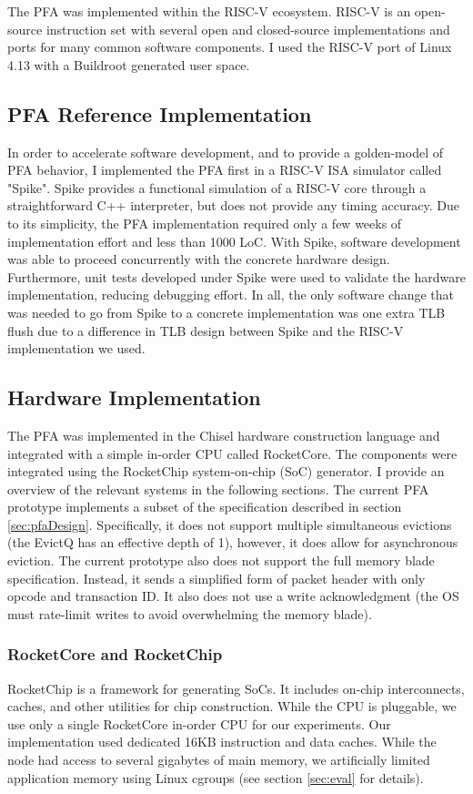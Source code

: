 The PFA was implemented within the RISC-V ecosystem. RISC-V is an open-source
instruction set with several open and closed-source implementations and ports
for many common software components\cite{riscv}. I used the RISC-V port of
Linux 4.13 with a Buildroot generated user
space.

\subsection{PFA Reference Implementation}
In order to accelerate software development, and to provide a golden-model of
PFA behavior, I implemented the PFA first in a RISC-V ISA simulator called
"Spike"\cite{spike}. Spike provides a functional simulation of a RISC-V core
through a straightforward C++ interpreter, but does not provide any timing
accuracy. Due to its simplicity, the PFA implementation required only a few
weeks of implementation effort and less than 1000 LoC. With Spike, software
development was able to proceed concurrently with the concrete hardware design.
Furthermore, unit tests developed under Spike were used to validate the
hardware implementation, reducing debugging effort. In all, the only software
change that was needed to go from Spike to a concrete implementation was one
extra TLB flush due to a difference in TLB design between Spike and the RISC-V
implementation we used.

\subsection{Hardware Implementation}
The PFA was implemented in the Chisel hardware construction
language\cite{chisel} and integrated with a simple in-order CPU called
RocketCore\cite{rocketCore}. The components were integrated using the
RocketChip system-on-chip (SoC) generator\cite{rocketChip}. I provide an
overview of the relevant systems in the following sections. The current PFA
prototype implements a subset of the specification described in
section \ref{sec:pfaDesign}. Specifically, it does not support multiple
simultaneous evictions (the EvictQ has an effective depth of 1), however, it
does allow for asynchronous eviction. The current prototype also does not
support the full memory blade specification. Instead, it sends a simplified form
of packet header with only opcode and transaction ID. It also does not use a
write acknowledgment (the OS must rate-limit writes to avoid overwhelming the
memory blade).
 
\subsubsection{RocketCore and RocketChip}
RocketChip\cite{rocketChip} is a framework for generating SoCs. It includes
on-chip interconnects, caches, and other utilities for chip construction. While
the CPU is pluggable, we use only a single RocketCore in-order CPU for our
experiments. Our implementation used dedicated 16KB instruction and data
caches. While the node had access to several gigabytes of main memory, we
artificially limited application memory using Linux cgroups (see section
\ref{sec:eval} for details).

